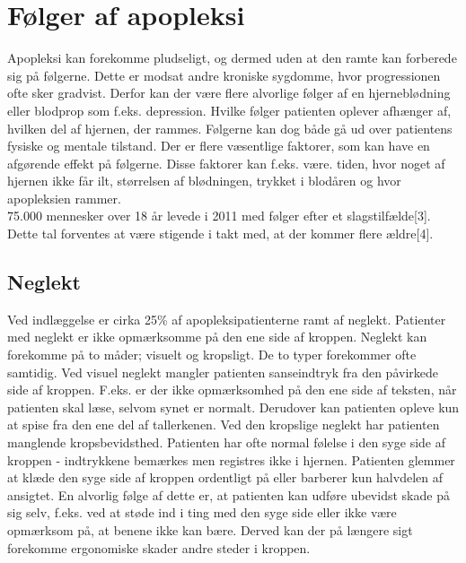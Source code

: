 \section{Følger af apopleksi }
Apopleksi kan forekomme pludseligt, og dermed uden at den ramte kan forberede sig på følgerne. Dette er modsat andre kroniske sygdomme, hvor progressionen ofte sker gradvist. Derfor kan der være flere alvorlige følger af en hjerneblødning eller blodprop som f.eks. depression. \citep{Muus2008} Hvilke følger patienten oplever afhænger af, hvilken del af hjernen, der rammes.\citep{Michael-Titus2010} Følgerne kan dog både gå ud over patientens fysiske og mentale tilstand. Der er flere væsentlige faktorer, som kan have en afgørende effekt på følgerne. Disse faktorer kan f.eks. være. tiden, hvor noget af hjernen ikke får ilt, størrelsen af blødningen, trykket i blodåren og hvor apopleksien rammer.\citep{Michael-Titus2010} \\
75.000 mennesker over 18 år levede i 2011 med følger efter et slagstilfælde[3]. Dette tal forventes at være stigende i takt med, at der kommer flere ældre[4]. %

\subsection{Neglekt}
Ved indlæggelse er cirka 25\% af apopleksipatienterne ramt af neglekt.
Patienter med neglekt er ikke opmærksomme på den ene side af kroppen. Neglekt kan forekomme på to måder; visuelt og kropsligt. De to typer forekommer ofte samtidig. Ved visuel neglekt mangler patienten sanseindtryk fra den påvirkede side af kroppen. F.eks. er der ikke opmærksomhed på den ene side af teksten, når patienten skal læse, selvom synet er normalt. Derudover kan patienten opleve kun at spise fra den ene del af tallerkenen. Ved den kropslige neglekt har patienten manglende kropsbevidsthed. Patienten har ofte normal følelse i den syge side af kroppen - indtrykkene bemærkes men registres ikke i hjernen. Patienten glemmer at klæde den syge side af kroppen ordentligt på eller barberer kun halvdelen af ansigtet. En alvorlig følge af dette er, at patienten kan udføre ubevidst skade på sig selv, f.eks. ved at støde ind i ting med den syge side eller ikke være opmærksom på, at benene ikke kan bære. Derved kan der på længere sigt forekomme ergonomiske skader andre steder i kroppen. \citep{Sundhed.dk}

